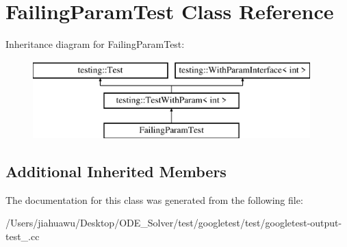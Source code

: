 \hypertarget{class_failing_param_test}{}\section{Failing\+Param\+Test Class Reference}
\label{class_failing_param_test}
Inheritance diagram for Failing\+Param\+Test\+:\begin{figure}[H]
\begin{center}
\leavevmode
\includegraphics[height=3.000000cm]{class_failing_param_test}
\end{center}
\end{figure}
\subsection*{Additional Inherited Members}


The documentation for this class was generated from the following file\+:\begin{DoxyCompactItemize}
\item 
/\+Users/jiahuawu/\+Desktop/\+O\+D\+E\+\_\+\+Solver/test/googletest/test/googletest-\/output-\/test\+\_\+.\+cc\end{DoxyCompactItemize}
